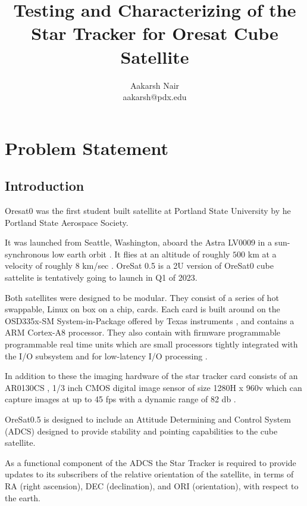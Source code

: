 \documentclass[]{article}
\title{Testing and Characterizing of the  Star Tracker for Oresat Cube Satellite}
\author{Aakarsh Nair \\ aakarsh@pdx.edu}
\begin{document}
	\maketitle
	
	
	\section{Problem Statement}
	
	\subsection{Introduction}
	
	Oresat0 \cite{Oresat0} was the first student built satellite at Portland State 
	University by he Portland State Aerospace Society. 
	
	It was launched from Seattle, Washington, aboard the Astra LV0009 
	in a sun-synchronous low earth orbit \cite{Oresat0Orbit}. It flies at an altitude of roughly $500$ km at a velocity of roughly $8$ km/sec \cite{Oresat0Orbit2}. OreSat 0.5 is a 2U version of 
	OreSat0 cube sattelite is tentatively going to launch in Q1 of 2023. 
	
	Both satellites were designed to be modular. They consist of a series of hot swappable,  Linux on box on a chip, cards.  Each card is built around on 
	the OSD335x-SM System-in-Package offered by Texas instruments \cite{Octavio-OSD335x},  and contains a ARM Cortex-A8 processor. They also contain with firmware programmable programmable real time units 
	which are small processors tightly integrated  with the I/O subsystem and 
	for low-latency I/O processing \cite{PRU-Details}.
	
	In addition to these the imaging hardware of the star tracker card consists of an  AR0130CS \cite{AR0130CS}, 1/3 inch CMOS digital image sensor of 
	size 1280H x 960v which can capture images at up to 45 fps with 
	a dynamic range of 82 db \cite{PSAS_Star_Tracker_Hardware}.
	
	OreSat0.5 is designed to include an Attitude Determining and Control System (ADCS) designed to provide stability and pointing capabilities to the cube satellite.
	
	As a functional component of the ADCS the Star Tracker is required to provide updates to its subscribers of the relative orientation of the satellite, in terms of RA (right ascension), DEC (declination), and ORI (orientation), with respect to the earth. 
	
\end{document}
